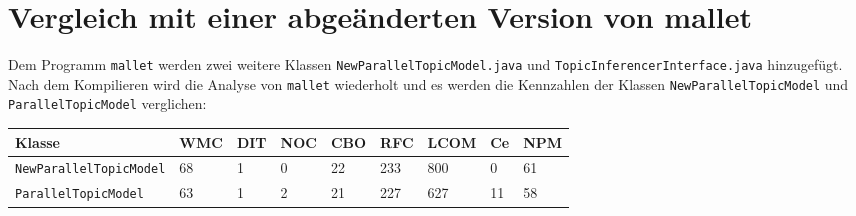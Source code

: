 \documentclass{scrreprt}
\newcommand{\lstx}[1]{\lstinline$#1$}
\begin{document}
\section{Vergleich mit einer abgeänderten Version von mallet}

Dem Programm \lstx{mallet} werden zwei weitere Klassen \lstx{NewParallelTopicModel.java} und \lstx{TopicInferencerInterface.java} hinzugefügt. Nach dem Kompilieren wird die Analyse von \lstx{mallet} wiederholt und es werden die Kennzahlen der Klassen \lstx{NewParallelTopicModel} und \lstx{ParallelTopicModel} verglichen:


\begin{tabular}{lllllllll}
\toprule
Klasse & WMC & DIT & NOC & CBO & RFC & LCOM & Ce & NPM \\
\midrule
\lstx{NewParallelTopicModel} & 68 & 1 & 0 & 22 & 233 & 800 & 0 & 61 \\
\lstx{ParallelTopicModel} & 63 & 1 & 2 & 21 & 227 & 627 & 11 & 58 \\
\bottomrule
\end{tabular}


\end{document}
